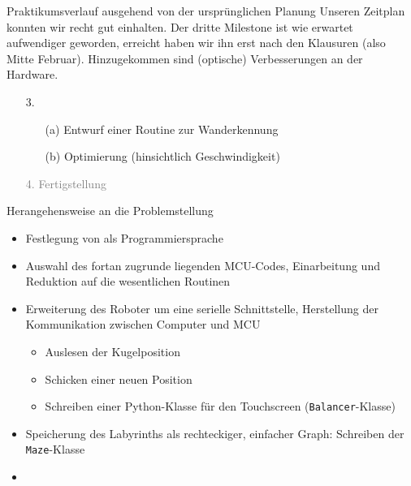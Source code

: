\documentclass{beamer}
\begin{document}
\begin{frame}[fragile,t]{Praktikumsverlauf ausgehend von der ursprünglichen Planung}
Unseren Zeitplan konnten wir recht gut einhalten. Der dritte Milestone ist wie erwartet aufwendiger geworden, erreicht haben wir ihn erst nach den Klausuren (also Mitte Februar). Hinzugekommen sind (optische) Verbesserungen an der Hardware. 

\smallskip
\begin{enumerate}
 \item[3.] 
 \begin{enumerate}
 \item[(a)] Entwurf einer Routine zur Wanderkennung
 \item[(b)] Optimierung (hinsichtlich Geschwindigkeit)
 \end{enumerate}
 \item[\textcolor{gray}{4.}] \textcolor{gray}{Fertigstellung}
\end{enumerate}
\end{frame}

\begin{frame}[fragile,t]{Herangehensweise an die Problemstellung}
\begin{itemize}
\item Festlegung von  als Programmiersprache
\item Auswahl des fortan zugrunde liegenden MCU-Codes, Einarbeitung und Reduktion auf die wesentlichen Routinen
\item Erweiterung des Roboter um eine serielle Schnittstelle, Herstellung der Kommunikation zwischen Computer und MCU 
\begin{itemize}
\item Auslesen der Kugelposition
\item Schicken einer neuen Position
\item Schreiben einer Python-Klasse für den Touchscreen (\verb~Balancer~-Klasse)
\end{itemize}
\item Speicherung des Labyrinths als rechteckiger, einfacher Graph: Schreiben der \verb~Maze~-Klasse
\item {}
\end{itemize}
\end{frame}
\end{document}
